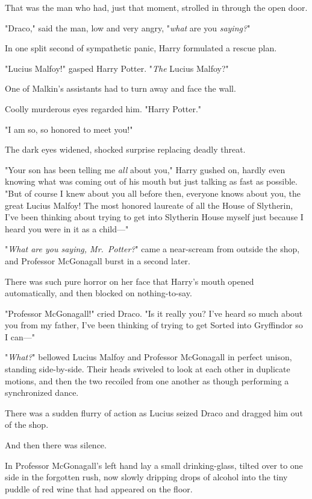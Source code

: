 That was the man who had, just that moment, strolled in through the open door.

"Draco," said the man, low and very angry, "\emph{what} are you \emph{saying?}"

In one split second of sympathetic panic, Harry formulated a rescue plan.

"Lucius Malfoy!" gasped Harry Potter. "\emph{The} Lucius Malfoy?"

One of Malkin's assistants had to turn away and face the wall.

Coolly murderous eyes regarded him. "Harry Potter."

"I am so, so honored to meet you!"

The dark eyes widened, shocked surprise replacing deadly threat.

"Your son has been telling me \emph{all} about you," Harry gushed on, hardly
even knowing what was coming out of his mouth but just talking as fast as
possible. "But of course I knew about you all before then, everyone knows about
you, the great Lucius Malfoy! The most honored laureate of all the House of
Slytherin, I've been thinking about trying to get into Slytherin House myself
just because I heard you were in it as a child—"

"\emph{What are you saying, Mr.~Potter?}" came a near-scream from outside the
shop, and Professor McGonagall burst in a second later.

There was such pure horror on her face that Harry's mouth opened automatically,
and then blocked on nothing-to-say.

"Professor McGonagall!" cried Draco. "Is it really you? I've heard so much
about you from my father, I've been thinking of trying to get Sorted into
Gryffindor so I can—"

"\emph{What?}" bellowed Lucius Malfoy and Professor McGonagall in perfect
unison, standing side-by-side. Their heads swiveled to look at each other in
duplicate motions, and then the two recoiled from one another as though
performing a synchronized dance.

There was a sudden flurry of action as Lucius seized Draco and dragged him out
of the shop.

And then there was silence.

In Professor McGonagall's left hand lay a small drinking-glass, tilted over to
one side in the forgotten rush, now slowly dripping drops of alcohol into the
tiny puddle of red wine that had appeared on the floor.

